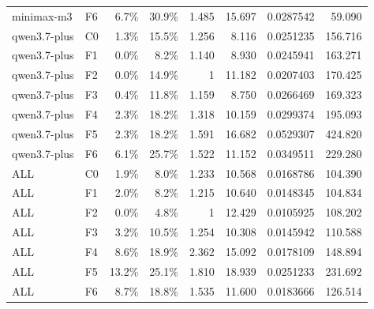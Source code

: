 \begin{tabular}{llrrrrrr}
minimax-m3 & F6 & 6.7\% & 30.9\% & 1.485 & 15.697 & 0.0287542 & 59.090 \\
qwen3.7-plus & C0 & 1.3\% & 15.5\% & 1.256 & 8.116 & 0.0251235 & 156.716 \\
qwen3.7-plus & F1 & 0.0\% & 8.2\% & 1.140 & 8.930 & 0.0245941 & 163.271 \\
qwen3.7-plus & F2 & 0.0\% & 14.9\% & 1 & 11.182 & 0.0207403 & 170.425 \\
qwen3.7-plus & F3 & 0.4\% & 11.8\% & 1.159 & 8.750 & 0.0266469 & 169.323 \\
qwen3.7-plus & F4 & 2.3\% & 18.2\% & 1.318 & 10.159 & 0.0299374 & 195.093 \\
qwen3.7-plus & F5 & 2.3\% & 18.2\% & 1.591 & 16.682 & 0.0529307 & 424.820 \\
qwen3.7-plus & F6 & 6.1\% & 25.7\% & 1.522 & 11.152 & 0.0349511 & 229.280 \\
ALL & C0 & 1.9\% & 8.0\% & 1.233 & 10.568 & 0.0168786 & 104.390 \\
ALL & F1 & 2.0\% & 8.2\% & 1.215 & 10.640 & 0.0148345 & 104.834 \\
ALL & F2 & 0.0\% & 4.8\% & 1 & 12.429 & 0.0105925 & 108.202 \\
ALL & F3 & 3.2\% & 10.5\% & 1.254 & 10.308 & 0.0145942 & 110.588 \\
ALL & F4 & 8.6\% & 18.9\% & 2.362 & 15.092 & 0.0178109 & 148.894 \\
ALL & F5 & 13.2\% & 25.1\% & 1.810 & 18.939 & 0.0251233 & 231.692 \\
ALL & F6 & 8.7\% & 18.8\% & 1.535 & 11.600 & 0.0183666 & 126.514 \\
\bottomrule
\end{tabular}

